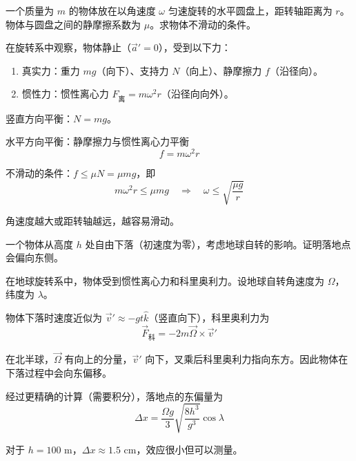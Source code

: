 \begin{example}
    一个质量为 $m$ 的物体放在以角速度 $\omega$ 匀速旋转的水平圆盘上，距转轴距离为 $r$。物体与圆盘之间的静摩擦系数为 $\mu$。求物体不滑动的条件。
    \begin{solution}
        在旋转系中观察，物体静止（$\vec{a}' = 0$），受到以下力：
        \begin{enumerate}
            \item 真实力：重力 $mg$（向下）、支持力 $N$（向上）、静摩擦力 $f$（沿径向）。
            \item 惯性力：惯性离心力 $F_{\text{离}} = m\omega^2 r$（沿径向向外）。
        \end{enumerate}
        
        竖直方向平衡：$N = mg$。
        
        水平方向平衡：静摩擦力与惯性离心力平衡
        \begin{equation}
            f = m\omega^2 r
        \end{equation}
        
        不滑动的条件：$f \leqslant \mu N = \mu mg$，即
        \begin{equation}
            m\omega^2 r \leqslant \mu mg \quad \Longrightarrow \quad \omega \leqslant \sqrt{\frac{\mu g}{r}}
        \end{equation}
        
        角速度越大或距转轴越远，越容易滑动。
    \end{solution}
\end{example}

\begin{example}
    一个物体从高度 $h$ 处自由下落（初速度为零），考虑地球自转的影响。证明落地点会偏向东侧。
    \begin{solution}
        在地球旋转系中，物体受到惯性离心力和科里奥利力。设地球自转角速度为 $\Omega$，纬度为 $\lambda$。
        
        物体下落时速度近似为 $\vec{v}' \approx -gt\hat{k}$（竖直向下），科里奥利力为
        \begin{equation}
            \vec{F}_{\text{科}} = -2m\vec{\Omega} \times \vec{v}'
        \end{equation}
        
        在北半球，$\vec{\Omega}$ 有向上的分量，$\vec{v}'$ 向下，叉乘后科里奥利力指向东方。因此物体在下落过程中会向东偏移。
        
        经过更精确的计算（需要积分），落地点的东偏量为
        \begin{equation}
            \Delta x = \frac{\Omega g}{3}\sqrt{\frac{8h^3}{g^3}}\cos\lambda
        \end{equation}
        
        对于 $h = 100$ m，$\Delta x \approx 1.5$ cm，效应很小但可以测量。
    \end{solution}
\end{example}

